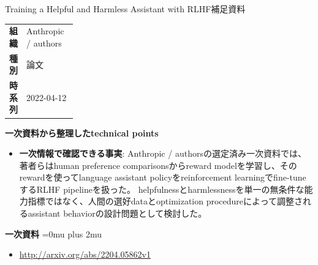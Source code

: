 \begin{technicalnote}{Training a Helpful and Harmless Assistant with RLHF}{補足資料}
\begingroup
\begin{tabularx}{\linewidth}{@{}>{\bfseries}p{0.22\linewidth}X@{}}
組織 & Anthropic / authors \\
種別 & 論文 \\
時系列 & 2022-04-12 \\
\end{tabularx}
\smallskip
{\bfseries 一次資料から整理したtechnical points}
\begin{itemize}[leftmargin=1.5em,itemsep=0.35em]
\item \textbf{一次情報で確認できる事実}: Anthropic / authorsの選定済み一次資料では、著者らはhuman preference comparisonsからreward modelを学習し、そのrewardを使ってlanguage assistant policyをreinforcement learningでfine-tuneするRLHF pipelineを扱った。 helpfulnessとharmlessnessを単一の無条件な能力指標ではなく、人間の選好dataとoptimization procedureによって調整されるassistant behaviorの設計問題として検討した。
\end{itemize}
\begin{minipage}{\linewidth}
\begin{samepage}
{\bfseries 一次資料}
\begingroup\sloppy
\Urlmuskip=0mu plus 2mu\relax
\begin{itemize}[leftmargin=1.5em,itemsep=0.25em]
\item {\scriptsize\url{http://arxiv.org/abs/2204.05862v1}}
\end{itemize}
\endgroup
\end{samepage}
\end{minipage}
\endgroup
\end{technicalnote}
\medskip

